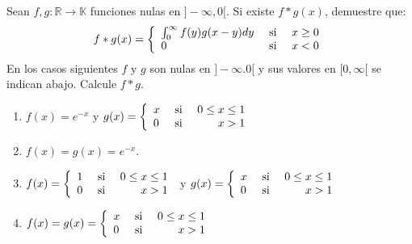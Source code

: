 \documentclass[12pt]{report}
\theoremstyle{largebreak}
\newcommand\cf[3]{\ensuremath{#1:#2\rightarrow#3}}
\begin{document}
    \begin{excer}
        Sean $\cf{f,g}{\mathbb{R}}{\mathbb{K}}$ funciones nulas en $]-\infty,0[$. Si existe $f*g(x)$, demuestre que:
        \begin{equation*}
            f*g(x)=\left\{
                \begin{array}{lcr}
                    \int_{0}^\infty f(y)g(x-y)dy & \textup{ si } & x\geq0\\
                    0 & \textup{ si }&x<0\\
                \end{array}
            \right.
        \end{equation*}
        En los casos siguientes $f$ y $g$ son nulas en $]-\infty.0[$ y sus valores en $[0,\infty[$ se indican abajo. Calcule $f*g$.
        \begin{enumerate}
            \item $f(x)=e^{-x}$ y $g(x)=\left\{
                    \begin{array}{lcr}
                        x & \textup{ si } & 0\leq x\leq 1 \\
                        0 & \textup{ si }&x>1\\
                    \end{array}
                \right.$
            \item $f(x)=g(x)=e^{-x}$.
            \item $f(x)=\left\{
                \begin{array}{lcr}
                    1 & \textup{ si } & 0\leq x\leq 1 \\
                    0 & \textup{ si }&x>1\\
                \end{array}
            \right.$ y $g(x)=\left\{
                \begin{array}{lcr}
                    x & \textup{ si } & 0\leq x\leq 1 \\
                    0 & \textup{ si }&x>1\\
                \end{array}
            \right.$
            \item $f(x)=g(x)=\left\{
                \begin{array}{lcr}
                    x & \textup{ si } & 0\leq x\leq 1 \\
                    0 & \textup{ si }&x>1\\
                \end{array}
            \right.$
        \end{enumerate}
    \end{excer}
\end{document}
